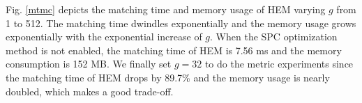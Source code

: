 \documentclass[runningheads]{llncs}
\begin{document}




Fig. \ref{mtmc} depicts the matching time and memory usage of HEM varying $g$ from 1 to 512. The matching time dwindles exponentially and the memory usage grows exponentially with the exponential increase of $g$. When the SPC optimization method is not enabled, the matching time of HEM is 7.56 ms and the memory consumption is 152 MB. We finally set $g=32$ to do the metric experiments since the matching time of HEM drops by 89.7\% and the memory usage is nearly doubled, which makes a good trade-off.

\end{document}
